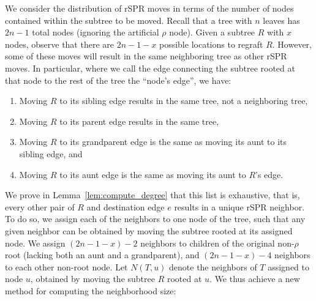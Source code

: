 \documentclass[]{elsarticle}
\begin{document}
We consider the distribution of rSPR moves in terms of the number of nodes contained within the subtree to be moved.
Recall that a tree with $n$ leaves has $2n-1$ total nodes (ignoring the artificial $\rho$ node).
Given a subtree $R$ with $x$ nodes, observe that there are $2n-1 - x$ possible locations to regraft $R$.
However, some of these moves will result in the same neighboring tree as other rSPR moves.
In particular, where we call the edge connecting the subtree rooted at that node to the rest of the tree the ``node's edge'', we have:
\begin{enumerate}
\item Moving $R$ to its sibling edge results in the same tree, not a neighboring tree,
\item Moving $R$ to its parent edge results in the same tree,
\item Moving $R$ to its grandparent edge is the same as moving its aunt to its sibling edge, and
\item Moving $R$ to its aunt edge is the same as moving its aunt to $R$'s edge.
\end{enumerate}
We prove in Lemma~\ref{lem:compute_degree} that this list is exhaustive, that is, every other pair of $R$ and destination edge $e$ results in a unique rSPR neighbor.
To do so, we assign each of the neighbors to one node of the tree, such that any given neighbor can be obtained by moving the subtree rooted at its assigned node.
We assign $(2n-1-x)-2$ neighbors to children of the original non-$\rho$ root (lacking both an aunt and a grandparent), and $(2n-1-x)-4$ neighbors to each other non-root node.
Let $N(T,u)$ denote the neighbors of $T$ assigned to node $u$, obtained by moving the subtree $R$ rooted at $u$.
We thus achieve a new method for computing the neighborhood size:
\end{document}
